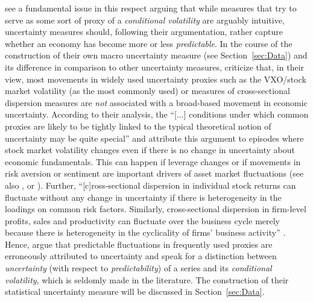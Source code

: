 \documentclass[a4paper,11pt,listof=nochaptergap,oneside,pointednumbers,bibtotoc,bigheadings,liststotoc,hidelinks]{scrbook}
\theoremstyle{mysatz}
\theoremstyle{mydefinition}
\theoremstyle{mytheorem}
\theoremstyle{mybemerkung}
\begin{document}
\citet{juradoetal:15} see a fundamental issue in this respect arguing that while measures that try to serve as some sort of proxy of a \textit{conditional volatility} are arguably intuitive, uncertainty measures should, following their argumentation, rather capture whether an economy has become more or less \textit{predictable}. In the course of the construction of their own macro uncertainty measure (see Section~\ref{sec:Data}) and its difference in comparison to other uncertainty measures, \citet{juradoetal:15} criticize that, in their view, most movements in widely used uncertainty proxies such as the VXO/stock market volatility (as the most commonly used) or measures of cross-sectional dispersion measures are \textit{not} associated with a broad-based movement in economic uncertainty. According to their analysis, the ``[...] conditions under which common proxies are likely to be tightly linked to the typical theoretical notion of uncertainty may be quite special'' \citep[p. 1178]{juradoetal:15} and attribute this argument to episodes where stock market volatility changes even if there is no change in uncertainty about economic fundamentals. This can happen if leverage changes or if movements in risk aversion or sentiment are important drivers of asset market fluctuations (see also \citet{bekaertetal:13}, \citet{moore:17} or \citet{IMF:17}). Further, ``[c]ross-sectional dispersion in individual stock returns can fluctuate without any change in uncertainty if there is heterogeneity in the loadings on common risk factors. Similarly, cross-sectional dispersion in firm-level profits, sales and productivity can fluctuate over the business cycle merely because there is heterogeneity in the cyclicality of firms' business activity'' \citep[p. 1178]{juradoetal:15}. Hence, \citet{juradoetal:15} argue that predictable fluctuations in frequently used proxies are erroneously attributed to uncertainty and speak for a distinction between \textit{uncertainty} (with respect to \textit{predictability}) of a series and its \textit{conditional volatility}, which is seldomly made in the literature. The construction of their statistical uncertainty measure will be discussed in Section~\ref{sec:Data}.\\
\end{document}
